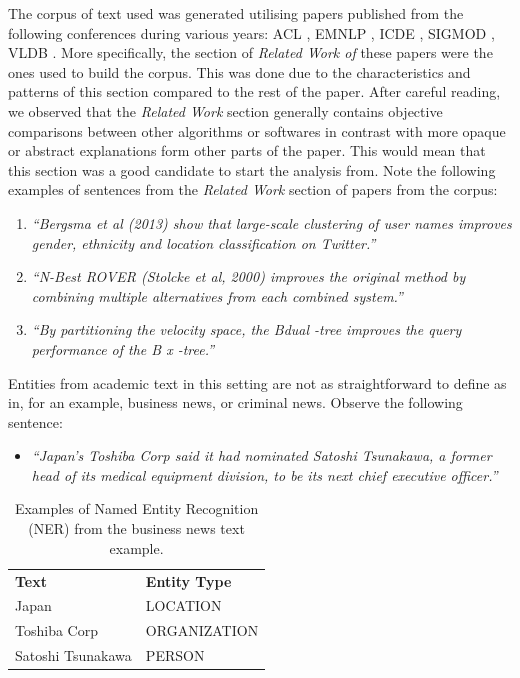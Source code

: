 \documentclass[11pt,a4paper,openright]{memoir}
\begin{document}
The corpus of text used was generated utilising papers published from the following conferences during various years: ACL \cite{acl}, EMNLP \cite{emnlp}, ICDE \cite{icde}, SIGMOD \cite{sigmod}, VLDB \cite{vldb}. More specifically, the section of \emph{Related Work of} these papers were the ones used to build the corpus. This was done due to the characteristics and patterns of this section compared to the rest of the paper. After careful reading, we observed that the \emph{Related Work} section generally contains objective comparisons between other algorithms or softwares in contrast with more opaque or abstract explanations form other parts of the paper. This would mean that this section was a good candidate to start the analysis from. Note the following examples of sentences from the \emph{Related Work} section of papers from the corpus:
\begin{enumerate}
	\item \emph{\enquote{Bergsma et al (2013) show that large-scale clustering of user names improves gender, ethnicity and location classification on Twitter.}}
	\item \emph{\enquote{N-Best ROVER (Stolcke et al, 2000) improves the original method by combining multiple alternatives from each combined system.}}
	\item \emph{\enquote{By partitioning the velocity space, the Bdual -tree improves the query performance of the B x -tree.}}
\end{enumerate}

Entities from academic text in this setting are not as straightforward to define as in, for an example, business news, or criminal news. Observe the following sentence:
\begin{itemize}
	\item \emph{\enquote{Japan's Toshiba Corp said it had nominated Satoshi Tsunakawa, a former head of its medical equipment division, to be its next chief executive officer.}}
\end{itemize}

\begin{table}[!htbp]
  \centering
    \begin{tabular}{ll}
      \textbf{Text}             & \textbf{Entity Type} \\
      Japan                     & LOCATION            \\
      Toshiba Corp              & ORGANIZATION          \\
      Satoshi Tsunakawa         & PERSON           
    \end{tabular}
  \caption[NER from the business news example.]{Examples of Named Entity Recognition (NER) from the business news text example.}
  \label{tab:entities_from_business_text}
\end{table}
\end{document}
